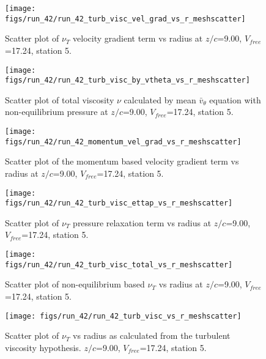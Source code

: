 \begin{figure}[H]
\centering
\texttt{[image: figs/run\_42/run\_42\_turb\_visc\_vel\_grad\_vs\_r\_meshscatter]}
\caption{Scatter plot of $\nu_T$ velocity gradient term vs radius at $z/c$=9.00, $V_{free}$=17.24, station 5.}
\end{figure}


\begin{figure}[H]
\centering
\texttt{[image: figs/run\_42/run\_42\_turb\_visc\_by\_vtheta\_vs\_r\_meshscatter]}
\caption{Scatter plot of total viscosity $\nu$ calculated by mean $\bar{v}_{\theta}$ equation with non-equilibrium pressure at $z/c$=9.00, $V_{free}$=17.24, station 5.}
\end{figure}


\begin{figure}[H]
\centering
\texttt{[image: figs/run\_42/run\_42\_momentum\_vel\_grad\_vs\_r\_meshscatter]}
\caption{Scatter plot of the momentum based velocity gradient term vs radius at $z/c$=9.00, $V_{free}$=17.24, station 5.}
\end{figure}


\begin{figure}[H]
\centering
\texttt{[image: figs/run\_42/run\_42\_turb\_visc\_ettap\_vs\_r\_meshscatter]}
\caption{Scatter plot of $\nu_T$ pressure relaxation term vs radius at $z/c$=9.00, $V_{free}$=17.24, station 5.}
\end{figure}


\begin{figure}[H]
\centering
\texttt{[image: figs/run\_42/run\_42\_turb\_visc\_total\_vs\_r\_meshscatter]}
\caption{Scatter plot of non-equilibrium based $\nu_T$ vs radius at $z/c$=9.00, $V_{free}$=17.24, station 5.}
\end{figure}


\begin{figure}[H]
\centering
\texttt{[image: figs/run\_42/run\_42\_turb\_visc\_vs\_r\_meshscatter]}
\caption{Scatter plot of $\nu_T$ vs radius as calculated from the turbulent viscosity hypothesis. $z/c$=9.00, $V_{free}$=17.24, station 5.}
\end{figure}


